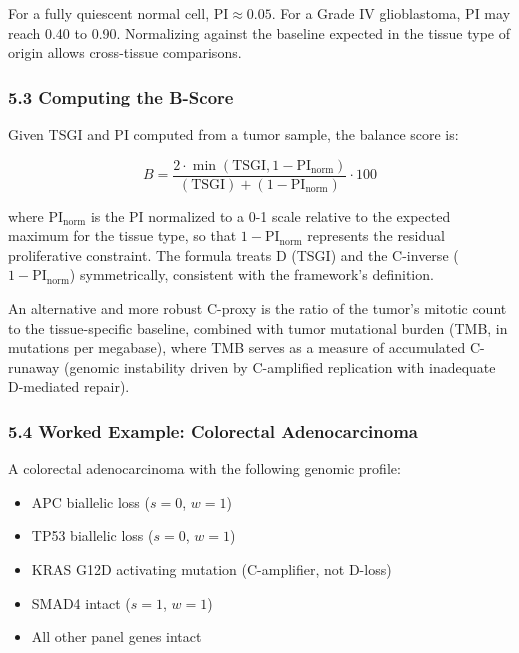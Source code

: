 \documentclass[
  11pt,
  letterpaper,
]{article}
\providecommand{\tightlist}{%
  \setlength{\itemsep}{0pt}\setlength{\parskip}{0pt}}
\begin{document}
For a fully quiescent normal cell, \(\text{PI} \approx 0.05\). For a
Grade IV glioblastoma, \(\text{PI}\) may reach 0.40 to 0.90. Normalizing
against the baseline expected in the tissue type of origin allows
cross-tissue comparisons.

\subsubsection{5.3 Computing the B-Score}\label{computing-the-b-score}

Given TSGI and PI computed from a tumor sample, the balance score is:

\[B = \frac{2 \cdot \min(\text{TSGI}, 1 - \text{PI}_\text{norm})}{(\text{TSGI}) + (1 - \text{PI}_\text{norm})} \cdot 100\]

where \(\text{PI}_\text{norm}\) is the PI normalized to a 0-1 scale
relative to the expected maximum for the tissue type, so that
\(1 - \text{PI}_\text{norm}\) represents the residual proliferative
constraint. The formula treats D (TSGI) and the C-inverse
(\(1 - \text{PI}_\text{norm}\)) symmetrically, consistent with the
framework's definition.

An alternative and more robust C-proxy is the ratio of the tumor's
mitotic count to the tissue-specific baseline, combined with tumor
mutational burden (TMB, in mutations per megabase), where TMB serves as
a measure of accumulated C-runaway (genomic instability driven by
C-amplified replication with inadequate D-mediated repair).

\subsubsection{5.4 Worked Example: Colorectal
Adenocarcinoma}\label{worked-example-colorectal-adenocarcinoma}

A colorectal adenocarcinoma with the following genomic profile:

\begin{itemize}
\tightlist
\item
  APC biallelic loss (\(s = 0\), \(w = 1\))
\item
  TP53 biallelic loss (\(s = 0\), \(w = 1\))
\item
  KRAS G12D activating mutation (C-amplifier, not D-loss)
\item
  SMAD4 intact (\(s = 1\), \(w = 1\))
\item
  All other panel genes intact
\end{itemize}
\end{document}
